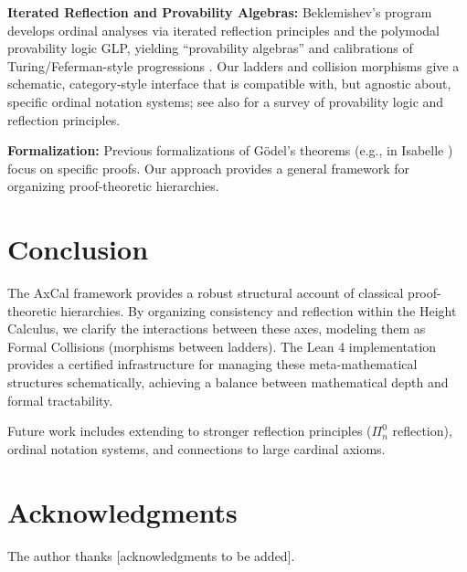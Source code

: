 \documentclass[11pt]{article}
\begin{document}
\textbf{Iterated Reflection and Provability Algebras:} Beklemishev’s program develops ordinal analyses via iterated reflection principles and the polymodal provability logic GLP, yielding “provability algebras” and calibrations of Turing/Feferman-style progressions \cite{Beklemishev2003,Beklemishev2004}. Our ladders and collision morphisms give a schematic, category‑style interface that is compatible with, but agnostic about, specific ordinal notation systems; see also \cite{ArtemovBeklemishev2004} for a survey of provability logic and reflection principles.

\textbf{Formalization:} Previous formalizations of Gödel's theorems (e.g., in Isabelle \cite{Paulson}) focus on specific proofs. Our approach provides a general framework for organizing proof-theoretic hierarchies.

\section{Conclusion}
The AxCal framework provides a robust structural account of classical proof-theoretic hierarchies. By organizing consistency and reflection within the Height Calculus, we clarify the interactions between these axes, modeling them as Formal Collisions (morphisms between ladders). The Lean 4 implementation provides a certified infrastructure for managing these meta-mathematical structures schematically, achieving a balance between mathematical depth and formal tractability.

Future work includes extending to stronger reflection principles ($\Pi^0_n$ reflection), ordinal notation systems, and connections to large cardinal axioms.

\section*{Acknowledgments}

The author thanks [acknowledgments to be added].
\end{document}
